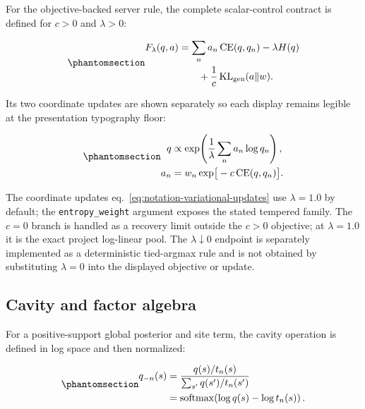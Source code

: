 \documentclass[
  english,
]{article}
\theoremstyle{plain}
\theoremstyle{definition}
\theoremstyle{remark}
\theoremstyle{definition}
\begin{document}
For the objective-backed server rule, the complete scalar-control
contract is defined for \(c>0\) and \(\lambda>0\):

\begin{equation}\protect\phantomsection\label{eq:notation-variational-objective}{\begin{aligned}
F_\lambda(q,a)
 &= \sum_n a_n\,\mathrm{CE}(q,q_n)
    -\lambda H(q)\\
 &\qquad +\frac{1}{c}\,\mathrm{KL}_{\rm gen}(a\Vert w).
\end{aligned}}\end{equation}

Its two coordinate updates are shown separately so each display remains
legible at the presentation typography floor:

\begin{equation}\protect\phantomsection\label{eq:notation-variational-updates}{\begin{aligned}
q &\propto \exp\!\left(
\frac{1}{\lambda}\sum_n a_n\log q_n\right),\\
a_n &= w_n\exp\!\big[-c\,\mathrm{CE}(q,q_n)\big].
\end{aligned}}\end{equation}

The coordinate updates eq.~\ref{eq:notation-variational-updates} use
\(\lambda=1.0\) by default; the \texttt{entropy\_weight} argument
exposes the stated tempered family. The \(c=0\) branch is handled as a
recovery limit outside the \(c>0\) objective; at \(\lambda=1.0\) it is
the exact project log-linear pool. The \(\lambda\downarrow0\) endpoint
is separately implemented as a deterministic tied-argmax rule and is not
obtained by substituting \(\lambda=0\) into the displayed objective or
update.

\subsection{Cavity and factor algebra}\label{cavity-and-factor-algebra}

For a positive-support global posterior and site term, the cavity
operation is defined in log space and then normalized:

\begin{equation}\protect\phantomsection\label{eq:notation-cavity}{\begin{aligned}
q_{-n}(s)
&= \frac{q(s)/t_n(s)}{\sum_{s'}q(s')/t_n(s')}\\
&= \operatorname{softmax}\!\left(\log q(s)-\log t_n(s)\right).
\end{aligned}}\end{equation}
\end{document}
